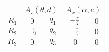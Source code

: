 \begin{tabular}{c|c|c|c|c|}
            \cline{2-5} &
            \multicolumn{2}{|c|}{$A_z(\theta,d)$} &
            \multicolumn{2}{|c|}{$A_x(\alpha,a)$} \\
            \hline
        \multicolumn{1}{|c|}{$R_1$} & $0$ & $q_{1}$ & $-{{\pi}\over{2}}$ & $0$ \\
            \hline
        \multicolumn{1}{|c|}{$R_2$} & $-{{\pi}\over{2}}$ & $q_{2}$ & $-{{\pi}\over{2}}$ & $0$ \\
            \hline
        \multicolumn{1}{|c|}{$R_3$} & $0$ & $q_{3}$ & $0$ & $0$ \\
            \hline
\end{tabular}
